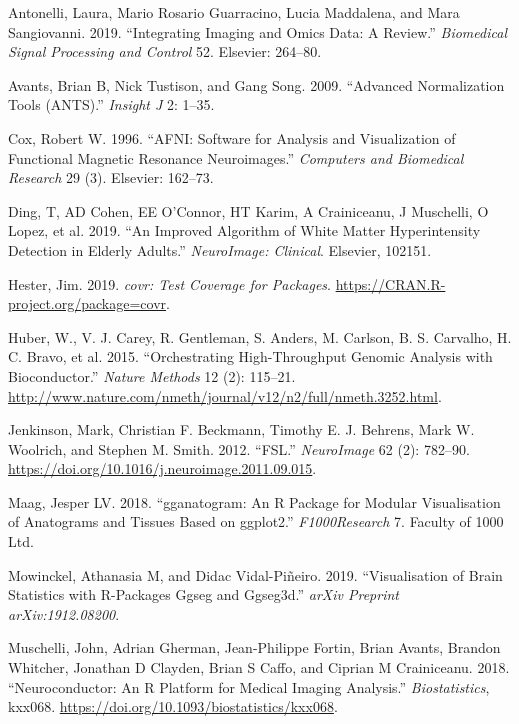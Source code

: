 \documentclass[]{elsarticle} %
\begin{document}
\hypertarget{refs}{}
\leavevmode\hypertarget{ref-antonelli2019integrating}{}%
Antonelli, Laura, Mario Rosario Guarracino, Lucia Maddalena, and Mara Sangiovanni. 2019. ``Integrating Imaging and Omics Data: A Review.'' \emph{Biomedical Signal Processing and Control} 52. Elsevier: 264--80.

\leavevmode\hypertarget{ref-avants2009advanced}{}%
Avants, Brian B, Nick Tustison, and Gang Song. 2009. ``Advanced Normalization Tools (ANTS).'' \emph{Insight J} 2: 1--35.

\leavevmode\hypertarget{ref-afni}{}%
Cox, Robert W. 1996. ``AFNI: Software for Analysis and Visualization of Functional Magnetic Resonance Neuroimages.'' \emph{Computers and Biomedical Research} 29 (3). Elsevier: 162--73.

\leavevmode\hypertarget{ref-ding2019improved}{}%
Ding, T, AD Cohen, EE O'Connor, HT Karim, A Crainiceanu, J Muschelli, O Lopez, et al. 2019. ``An Improved Algorithm of White Matter Hyperintensity Detection in Elderly Adults.'' \emph{NeuroImage: Clinical}. Elsevier, 102151.

\leavevmode\hypertarget{ref-covr}{}%
Hester, Jim. 2019. \emph{covr: Test Coverage for Packages}. \url{https://CRAN.R-project.org/package=covr}.

\leavevmode\hypertarget{ref-bioconductor}{}%
Huber, W., V. J. Carey, R. Gentleman, S. Anders, M. Carlson, B. S. Carvalho, H. C. Bravo, et al. 2015. ``Orchestrating High-Throughput Genomic Analysis with Bioconductor.'' \emph{Nature Methods} 12 (2): 115--21. \url{http://www.nature.com/nmeth/journal/v12/n2/full/nmeth.3252.html}.

\leavevmode\hypertarget{ref-fsl}{}%
Jenkinson, Mark, Christian F. Beckmann, Timothy E. J. Behrens, Mark W. Woolrich, and Stephen M. Smith. 2012. ``FSL.'' \emph{NeuroImage} 62 (2): 782--90. \url{https://doi.org/10.1016/j.neuroimage.2011.09.015}.

\leavevmode\hypertarget{ref-maag2018gganatogram}{}%
Maag, Jesper LV. 2018. ``gganatogram: An R Package for Modular Visualisation of Anatograms and Tissues Based on ggplot2.'' \emph{F1000Research} 7. Faculty of 1000 Ltd.

\leavevmode\hypertarget{ref-mowinckel2019visualisation}{}%
Mowinckel, Athanasia M, and Didac Vidal-Piñeiro. 2019. ``Visualisation of Brain Statistics with R-Packages Ggseg and Ggseg3d.'' \emph{arXiv Preprint arXiv:1912.08200}.

\leavevmode\hypertarget{ref-neuroconductor}{}%
Muschelli, John, Adrian Gherman, Jean-Philippe Fortin, Brian Avants, Brandon Whitcher, Jonathan D Clayden, Brian S Caffo, and Ciprian M Crainiceanu. 2018. ``Neuroconductor: An R Platform for Medical Imaging Analysis.'' \emph{Biostatistics}, kxx068. \url{https://doi.org/10.1093/biostatistics/kxx068}.
\end{document}

